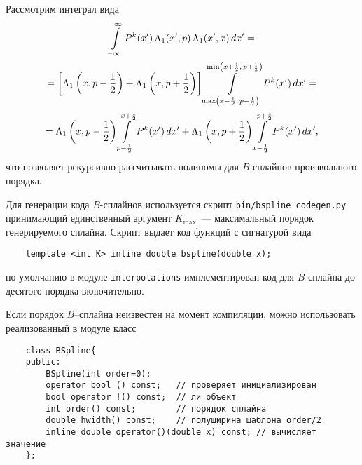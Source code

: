 Рассмотрим интеграл вида
\begin{multline}
  \int\limits_{-\infty}^{\infty} P^k(x')\,
  \Lambda_1(x',p)\,\Lambda_1(x', x)\, dx'
=\\=
\left[\Lambda_1\left(x,p-\frac12\right)+\Lambda_1\left(x,p+\frac12\right)\right]
\int\limits_{\max\left(x-\frac12,\,p-\frac12\right)}^{\min\left(x+\frac12,\,p+\frac12\right)}
P^k(x')\, dx'
=\\=
\Lambda_1\left(x,p-\frac12\right)\int\limits_{p-\frac12}^{x+\frac12} P^k(x')\,dx'
+
\Lambda_1\left(x,p+\frac12\right)\int\limits_{x-\frac12}^{p+\frac12} P^k(x')\,dx',
\notag
\end{multline}
что позволяет рекурсивно рассчитывать полиномы для $B$-сплайнов
произвольного порядка.

Для генерации кода $B$-сплайнов используется скрипт
\verb'bin/bspline_codegen.py' принимающий единственный аргумент $K_{\max}$~---
максимальный порядок генерируемого сплайна. Скрипт выдает код функций
с сигнатурой вида
\begin{verbatim}
    template <int K> inline double bspline(double x);
\end{verbatim}
по умолчанию в модуле \verb'interpolations' имплементирован код для
$B$-сплайна до десятого порядка включительно.

Если порядок $B$--сплайна неизвестен на момент компиляции, можно
использовать реализованный в модуле класс
\begin{verbatim}
    class BSpline{
    public:
        BSpline(int order=0);
        operator bool () const;   // проверяет инициализирован  
        bool operator !() const;  // ли объект
        int order() const;        // порядок сплайна
        double hwidth() const;    // полуширина шаблона order/2
        inline double operator()(double x) const; // вычисляет значение
    };
\end{verbatim}

